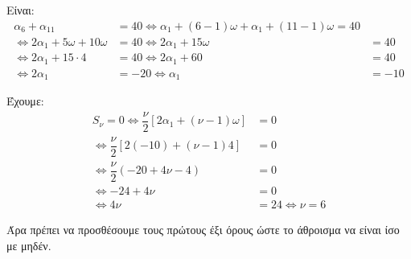 
\begin{alist}
\item Είναι:
\begin{align*}
\alpha_6 + \alpha_{11} &= 40 \Leftrightarrow \alpha_1 + (6 - 1)\omega + \alpha_1 + (11 - 1)\omega = 40 \\
\Leftrightarrow 2\alpha_1 + 5\omega + 10\omega &= 40 \Leftrightarrow 2\alpha_1 + 15\omega &= 40 \\
\Leftrightarrow 2\alpha_1 + 15 \cdot 4 &= 40 \Leftrightarrow 2\alpha_1 + 60 &= 40 \\
\Leftrightarrow 2\alpha_1 &= -20 \Leftrightarrow \alpha_1 &= -10
\end{align*}

\item Έχουμε:
\begin{align*}
S_\nu = 0 \Leftrightarrow \dfrac{\nu}{2} [2\alpha_1 + (\nu - 1)\omega] &= 0 \\
\Leftrightarrow \dfrac{\nu}{2} [2(-10) + (\nu - 1)4] &= 0 \\
\Leftrightarrow \dfrac{\nu}{2} (-20 + 4\nu - 4) &= 0 \\
\Leftrightarrow -24 + 4\nu &= 0 \\
\Leftrightarrow 4\nu &= 24 \Leftrightarrow \nu = 6
\end{align*}

Άρα πρέπει να προσθέσουμε τους πρώτους έξι όρους ώστε το άθροισμα να είναι ίσο με μηδέν.
\end{alist}

